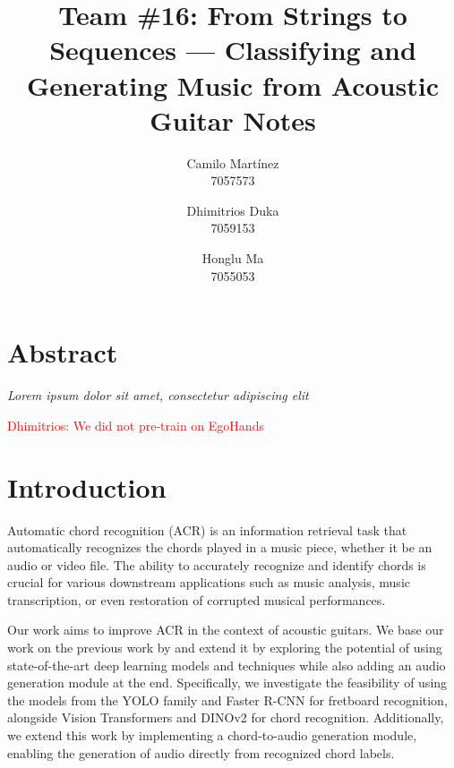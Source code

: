 \documentclass[10pt,twocolumn,letterpaper]{article}
\begin{document}
\newcommand{\dhimitrios}[1]{\textcolor{red}{Dhimitrios: #1}}

\title{Team \#16: From Strings to Sequences --- Classifying and Generating Music from Acoustic Guitar Notes}


\author{
    Camilo Martínez\\
    7057573\\
    \and
    Dhimitrios Duka\\
    7059153\\
    \and
    Honglu Ma\\
    7055053\\
}
\maketitle

\section{Abstract}
\emph{Lorem ipsum dolor sit amet, consectetur adipiscing elit}

\dhimitrios{We did not pre-train on EgoHands}

\section{Introduction}
Automatic chord recognition (ACR) is an information retrieval task that automatically recognizes the chords played in a music piece, whether it be an audio or video file. The ability to accurately recognize and identify chords is crucial for various downstream applications such as music analysis, music transcription, or even restoration of corrupted musical performances.

Our work aims to improve ACR in the context of acoustic guitars. We base our work on the previous work by \cite{Kristian_Zaman_Tenoyo_Jodhinata_2024} and extend it by exploring the potential of using state-of-the-art deep learning models and techniques while also adding an audio generation module at the end. Specifically, we investigate the feasibility of using the models from the YOLO \cite{redmon2016you} family and Faster R-CNN \cite{ren2016faster} for fretboard recognition, alongside Vision Transformers \cite{dosovitskiy2020image} and DINOv2 \cite{oquab2023dinov2} for chord recognition. Additionally, we extend this work by implementing a chord-to-audio generation module, enabling the generation of audio directly from recognized chord labels.
\end{document}
